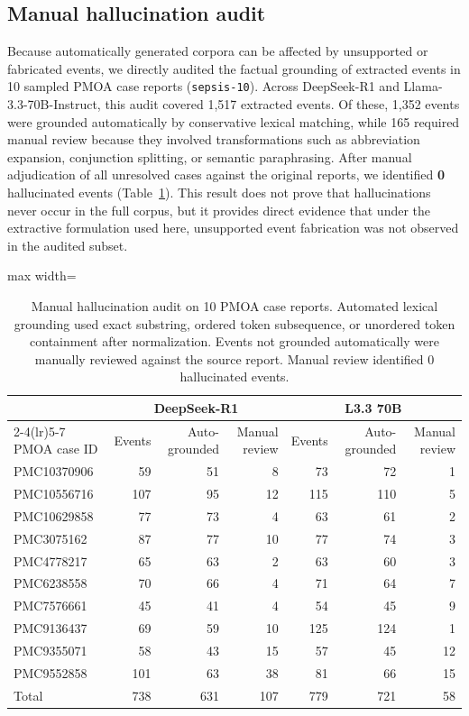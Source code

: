 \documentclass[pmlr,twocolumn,10pt]{jmlr} %
\begin{document}
\subsection{Manual hallucination audit}
\label{apd:hallucination_audit_results}
Because automatically generated corpora can be affected by unsupported or fabricated events, we directly audited the factual grounding of extracted events in 10 sampled PMOA case reports (\texttt{sepsis-10}).
Across DeepSeek-R1 and Llama-3.3-70B-Instruct, this audit covered 1,517 extracted events.
Of these, 1,352 events were grounded automatically by conservative lexical matching, while 165 required manual review because they involved transformations such as abbreviation expansion, conjunction splitting, or semantic paraphrasing.
After manual adjudication of all unresolved cases against the original reports, we identified \textbf{0} hallucinated events (Table~\ref{tab:hallucination_audit}).
This result does not prove that hallucinations never occur in the full corpus, but it provides direct evidence that under the extractive formulation used here, unsupported event fabrication was not observed in the audited subset.

\begin{table}[ht]
\centering
\small
\caption{Manual hallucination audit on 10 PMOA case reports. Automated lexical grounding used exact substring, ordered token subsequence, or unordered token containment after normalization. Events not grounded automatically were manually reviewed against the source report. Manual review identified 0 hallucinated events.}
\label{tab:hallucination_audit}
\begin{adjustbox}{max width=\textwidth}
\begin{tabular}{lrrrrrr}
\toprule
& \multicolumn{3}{c}{DeepSeek-R1} & \multicolumn{3}{c}{L3.3 70B} \\
\cmidrule(lr){2-4}\cmidrule(lr){5-7}
PMOA case ID & Events & Auto-grounded & Manual review & Events & Auto-grounded & Manual review \\
\midrule
PMC10370906 & 59 & 51 & 8 & 73 & 72 & 1 \\
PMC10556716 & 107 & 95 & 12 & 115 & 110 & 5 \\
PMC10629858 & 77 & 73 & 4 & 63 & 61 & 2 \\
PMC3075162 & 87 & 77 & 10 & 77 & 74 & 3 \\
PMC4778217 & 65 & 63 & 2 & 63 & 60 & 3 \\
PMC6238558 & 70 & 66 & 4 & 71 & 64 & 7 \\
PMC7576661 & 45 & 41 & 4 & 54 & 45 & 9 \\
PMC9136437 & 69 & 59 & 10 & 125 & 124 & 1 \\
PMC9355071 & 58 & 43 & 15 & 57 & 45 & 12 \\
PMC9552858 & 101 & 63 & 38 & 81 & 66 & 15 \\
\midrule
Total & 738 & 631 & 107 & 779 & 721 & 58 \\
\bottomrule
\end{tabular}
\end{adjustbox}
\end{table}
\end{document}
